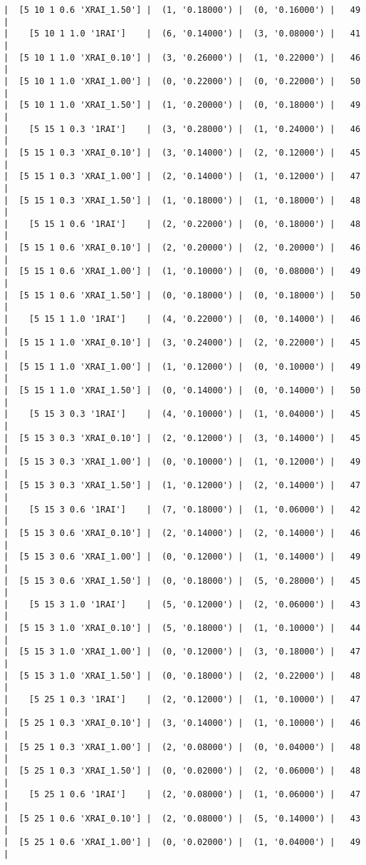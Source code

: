 \documentclass{article}
\begin{document}
\begin{verbatim}
|  [5 10 1 0.6 'XRAI_1.50'] |  (1, '0.18000') |  (0, '0.16000') |   49  |
|    [5 10 1 1.0 '1RAI']    |  (6, '0.14000') |  (3, '0.08000') |   41  |
|  [5 10 1 1.0 'XRAI_0.10'] |  (3, '0.26000') |  (1, '0.22000') |   46  |
|  [5 10 1 1.0 'XRAI_1.00'] |  (0, '0.22000') |  (0, '0.22000') |   50  |
|  [5 10 1 1.0 'XRAI_1.50'] |  (1, '0.20000') |  (0, '0.18000') |   49  |
|    [5 15 1 0.3 '1RAI']    |  (3, '0.28000') |  (1, '0.24000') |   46  |
|  [5 15 1 0.3 'XRAI_0.10'] |  (3, '0.14000') |  (2, '0.12000') |   45  |
|  [5 15 1 0.3 'XRAI_1.00'] |  (2, '0.14000') |  (1, '0.12000') |   47  |
|  [5 15 1 0.3 'XRAI_1.50'] |  (1, '0.18000') |  (1, '0.18000') |   48  |
|    [5 15 1 0.6 '1RAI']    |  (2, '0.22000') |  (0, '0.18000') |   48  |
|  [5 15 1 0.6 'XRAI_0.10'] |  (2, '0.20000') |  (2, '0.20000') |   46  |
|  [5 15 1 0.6 'XRAI_1.00'] |  (1, '0.10000') |  (0, '0.08000') |   49  |
|  [5 15 1 0.6 'XRAI_1.50'] |  (0, '0.18000') |  (0, '0.18000') |   50  |
|    [5 15 1 1.0 '1RAI']    |  (4, '0.22000') |  (0, '0.14000') |   46  |
|  [5 15 1 1.0 'XRAI_0.10'] |  (3, '0.24000') |  (2, '0.22000') |   45  |
|  [5 15 1 1.0 'XRAI_1.00'] |  (1, '0.12000') |  (0, '0.10000') |   49  |
|  [5 15 1 1.0 'XRAI_1.50'] |  (0, '0.14000') |  (0, '0.14000') |   50  |
|    [5 15 3 0.3 '1RAI']    |  (4, '0.10000') |  (1, '0.04000') |   45  |
|  [5 15 3 0.3 'XRAI_0.10'] |  (2, '0.12000') |  (3, '0.14000') |   45  |
|  [5 15 3 0.3 'XRAI_1.00'] |  (0, '0.10000') |  (1, '0.12000') |   49  |
|  [5 15 3 0.3 'XRAI_1.50'] |  (1, '0.12000') |  (2, '0.14000') |   47  |
|    [5 15 3 0.6 '1RAI']    |  (7, '0.18000') |  (1, '0.06000') |   42  |
|  [5 15 3 0.6 'XRAI_0.10'] |  (2, '0.14000') |  (2, '0.14000') |   46  |
|  [5 15 3 0.6 'XRAI_1.00'] |  (0, '0.12000') |  (1, '0.14000') |   49  |
|  [5 15 3 0.6 'XRAI_1.50'] |  (0, '0.18000') |  (5, '0.28000') |   45  |
|    [5 15 3 1.0 '1RAI']    |  (5, '0.12000') |  (2, '0.06000') |   43  |
|  [5 15 3 1.0 'XRAI_0.10'] |  (5, '0.18000') |  (1, '0.10000') |   44  |
|  [5 15 3 1.0 'XRAI_1.00'] |  (0, '0.12000') |  (3, '0.18000') |   47  |
|  [5 15 3 1.0 'XRAI_1.50'] |  (0, '0.18000') |  (2, '0.22000') |   48  |
|    [5 25 1 0.3 '1RAI']    |  (2, '0.12000') |  (1, '0.10000') |   47  |
|  [5 25 1 0.3 'XRAI_0.10'] |  (3, '0.14000') |  (1, '0.10000') |   46  |
|  [5 25 1 0.3 'XRAI_1.00'] |  (2, '0.08000') |  (0, '0.04000') |   48  |
|  [5 25 1 0.3 'XRAI_1.50'] |  (0, '0.02000') |  (2, '0.06000') |   48  |
|    [5 25 1 0.6 '1RAI']    |  (2, '0.08000') |  (1, '0.06000') |   47  |
|  [5 25 1 0.6 'XRAI_0.10'] |  (2, '0.08000') |  (5, '0.14000') |   43  |
|  [5 25 1 0.6 'XRAI_1.00'] |  (0, '0.02000') |  (1, '0.04000') |   49  |

\end{verbatim}
\end{document}
